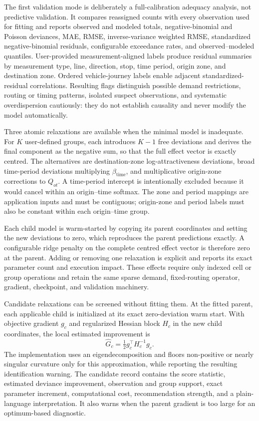 The first validation mode is deliberately a full-calibration adequacy analysis,
not predictive validation.  It compares reassigned counts with every
observation used for fitting and reports observed and modeled totals,
negative-binomial and Poisson deviances, MAE, RMSE, inverse-variance weighted
RMSE, standardized negative-binomial residuals, configurable exceedance rates,
and observed--modeled quantiles.  User-provided measurement-aligned labels
produce residual summaries by measurement type, line, direction, stop, time
period, origin zone, and destination zone.  Ordered vehicle-journey labels
enable adjacent standardized-residual correlations.  Resulting flags distinguish
possible demand restrictions, routing or timing patterns, isolated suspect
observations, and systematic overdispersion cautiously: they do not establish
causality and never modify the model automatically.

Three atomic relaxations are available when the minimal model is inadequate.
For $K$ user-defined groups, each introduces $K-1$ free deviations and derives
the final component as the negative sum, so that the full effect vector is
exactly centred.  The alternatives are destination-zone log-attractiveness
deviations, broad time-period deviations multiplying
$\beta_{\mathrm{time}}$, and multiplicative origin-zone corrections to
$Q_{ot}$.  A time-period intercept is intentionally excluded because it would
cancel within an origin--time softmax.  The zone and period mappings are
application inputs and must be contiguous; origin-zone and period labels must
also be constant within each origin--time group.

Each child model is warm-started by copying its parent coordinates and setting
the new deviations to zero, which reproduces the parent predictions exactly.
A configurable ridge penalty on the complete centred effect vector is therefore
zero at the parent.  Adding or removing one relaxation is explicit and reports
its exact parameter count and execution impact.  These effects require only
indexed cell or group operations and retain the same sparse demand, fixed-routing
operator, gradient, checkpoint, and validation machinery.

Candidate relaxations can be screened without fitting them.  At the fitted
parent, each applicable child is initialized at its exact zero-deviation warm
start.  With objective gradient $g_c$ and regularized Hessian block $H_c$ in the
new child coordinates, the local estimated improvement is
\[
 \widehat{G}_c=\tfrac12 g_c^\top H_c^{-1}g_c.
\]
The implementation uses an eigendecomposition and floors non-positive or nearly
singular curvature only for this approximation, while reporting the resulting
identification warning.  The candidate record contains the score statistic,
estimated deviance improvement, observation and group support, exact parameter
increment, computational cost, recommendation strength, and a plain-language
interpretation.  It also warns when the parent gradient is too large for an
optimum-based diagnostic.

